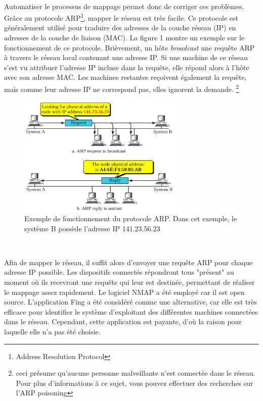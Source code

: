 ~

\noindent
Automatiser le processus de mappage permet donc de corriger ces problèmes. Grâce au protocole ARP\footnote{Address Resolution Protocol}, mapper le réseau est très facile. Ce protocole est généralement utilisé pour traduire des adresses de la couche réseau (IP) en adresses de la couche de liaison (MAC). La figure 1 montre un exemple sur le fonctionnement de ce protocole. Brièvement, un hôte \textit{broadcast} une requête ARP à travers le réseau local contenant une adresse IP. Si une machine de ce réseau s'est vu attribuer l'adresse IP incluse dans la requête, elle répond alors à l'hôte avec son adresse MAC. Les machines restantes reçoivent également la requête, mais comme leur adresse IP ne correspond pas, elles ignorent la demande. \footnote{ceci présume qu’aucune personne malveillante n’est connectée dans le réseau. Pour plus d'informations à ce sujet, vous pouvez effectuer des recherches sur l'ARP poisoning}

\begin{figure}[ht!]
  \centering
  \includegraphics[width=0.7\textwidth]{img/app/arp.png}
  \caption{Exemple de fonctionnement du protocole ARP. Dans cet exemple, le système B possède l'adresse IP 141.23.56.23 \cite{arp_img}}
  \label{fig:arp_ex}
\end{figure}

~

\noindent
Afin de mapper le réseau, il suffit alors d’envoyer une requête ARP pour chaque adresse IP possible. Les dispositifs connectés répondront tous "présent" au moment où ils recevront une requête qui leur est destinée, permettant de réaliser le mappage assez rapidement.  Le logiciel NMAP a été employé car il est open source. L’application Fing a été considéré comme une alternative, car elle est très efficace pour identifier le système d’exploitant des différentes machines connectées dans le réseau. Cependant, cette application est payante, d'où la raison pour laquelle elle n'a pas été choisie.

